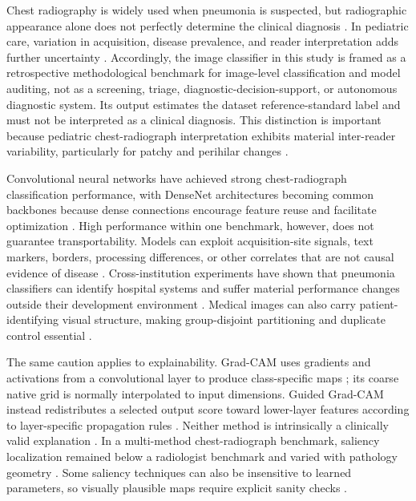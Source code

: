 \documentclass[runningheads]{llncs}
\newcommand{\citep}[1]{\cite{#1}}
\begin{document}
Chest radiography is widely used when pneumonia is suspected, but radiographic
appearance alone does not perfectly determine the clinical diagnosis \citep{cxr_limit2024}. In pediatric
care, variation in acquisition, disease prevalence, and reader interpretation adds
further uncertainty \citep{pediatric_var2024}. Accordingly, the image classifier in this study is framed as
a retrospective methodological benchmark for image-level classification and model
auditing, not as a screening, triage, diagnostic-decision-support, or autonomous
diagnostic system. Its output estimates the dataset reference-standard label and
must not be interpreted as a clinical diagnosis. This distinction is
important because pediatric chest-radiograph interpretation exhibits material
inter-reader variability, particularly for patchy and perihilar changes
\citep{elemraid2014}.

Convolutional neural networks have achieved strong chest-radiograph classification
performance, with DenseNet architectures becoming common backbones because dense
connections encourage feature reuse and facilitate optimization
\citep{huang2017,rajpurkar2017,densenet_med2024}. High performance within one benchmark, however,
does not guarantee transportability. Models can exploit acquisition-site signals,
text markers, borders, processing differences, or other correlates that are not
causal evidence of disease \citep{shortcut2024}. Cross-institution experiments have shown that pneumonia
classifiers can identify hospital systems and suffer material performance changes
outside their development environment \citep{zech2018}. Medical images can also
carry patient-identifying visual structure, making group-disjoint partitioning and
duplicate control essential \citep{packhauser2022,leakage2025}.

The same caution applies to explainability. Grad-CAM uses gradients and activations
from a convolutional layer to produce class-specific maps \citep{selvaraju2017}; its
coarse native grid is normally interpolated to input dimensions. Guided Grad-CAM instead
redistributes a selected output score toward lower-layer features according to
layer-specific propagation rules \citep{bach2015,montavon2019}. Neither method is
intrinsically a clinically valid explanation \citep{xai_quant2025}. In a multi-method chest-radiograph
benchmark, saliency localization remained below a radiologist benchmark and varied
with pathology geometry \citep{saporta2022}. Some saliency techniques can also be
insensitive to learned parameters, so visually plausible maps require explicit
sanity checks \citep{adebayo2018,xai_hybrid2024}.
\end{document}
